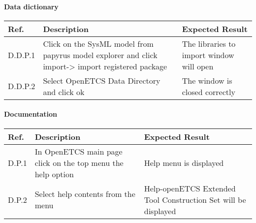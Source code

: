 \paragraph{Data dictionary}

\begin{center}
\begin{longtable}{|p{1cm}|p{6cm}|p{6cm}|}\hline
\textbf{Ref.} & \textbf{Description} & \textbf{Expected Result} \\\hline
D.D.P.1 & Click on the SysML model from papyrus model explorer and click import-> import registered package & The libraries to import window will open \\\hline
D.D.P.2 & Select OpenETCS Data Directory and click ok & The window is closed correctly\\\hline
\end{longtable}
\end{center}

\paragraph{Documentation}

\begin{center}
\begin{longtable}{|p{1cm}|p{6cm}|p{6cm}|}\hline
\textbf{Ref.} & \textbf{Description} & \textbf{Expected Result} \\\hline
D.P.1 & In OpenETCS main page click on the top menu the help option & Help menu is displayed \\\hline
D.P.2 & Select help contents from the menu & Help-openETCS Extended Tool Construction Set will be displayed\\\hline
\end{longtable}
\end{center}



